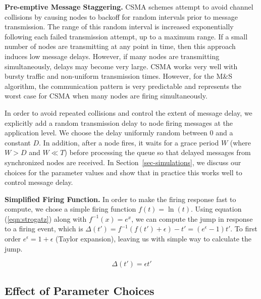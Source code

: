 \documentclass{sig-alternate}
\begin{document}
{%



{\bf Pre-emptive Message Staggering.} CSMA schemes attempt to avoid
channel collisions by causing nodes to backoff for random intervals
prior to message transmission. The range of this random interval is
increased exponentially following each failed transmission attempt, up
to a maximum range.  If a small number of nodes are transmitting at
any point in time, then this approach induces low message delays.
However, if many nodes are transmitting simultaneously, delays may
become very large. CSMA works very well with bursty traffic and
non-uniform transmission times.  However, for the M\&S algorithm, the
communication pattern is very predictable and represents the worst
case for CSMA when many nodes are firing simultaneously.

In order to avoid repeated collisions and control the extent of
message delay, we explicitly add a random transmission delay to node
firing messages at the application level. We choose the delay
uniformly random between 0 and a constant $D$. In addition, after a
node fires, it waits for a grace period $W$ (where $W>D$ and $W \ll T$)
before processing the queue so that delayed messages from synchronized
nodes are received. In Section~\ref{sec-simulations}, we discuss our
choices for the parameter values and show that in practice this works
well to control message delay.

{\bf Simplified Firing Function.} In order to make the firing response
fast to compute, we chose a simple firing function $f(t) =
\ln(t)$. Using equation (\ref{eqn:strogatz}) along with
$f^{-1}(x)=e^x$, we can compute the jump in response to a firing
event, which is
$\Delta(t')=f^{-1}(f(t')+\epsilon)-t'=(e^{\epsilon}-1)t'$. To first
order $e^\epsilon = 1 + \epsilon$ (Taylor expansion), leaving us with
 simple way to calculate the jump.

\begin{equation}\label{eqn:delta}
\Delta(t') = \epsilon t'
\end{equation}

\subsection{Effect of Parameter Choices}
\label{sec:params}

}
\end{document}
